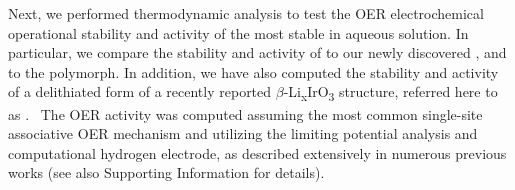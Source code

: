 %



%
%
Next, we performed  thermodynamic analysis to test the OER electrochemical operational stability and activity of the most stable \IrOx in aqueous solution.
%
In particular, we compare the stability and activity of \rIrOtwo to our newly discovered \aIrOthree, and to the \rIrOthree polymorph.
%
In addition, we have also computed the stability and activity of a delithiated form of a recently reported $\beta$-Li\textsubscript{x}IrO\textsubscript{3} structure, referred here to as \bIrOthree.~\cite{Pearce2017,Pearce2019}
%
The OER activity was computed assuming the most common single-site associative OER mechanism and utilizing the limiting potential analysis and computational hydrogen electrode, as described extensively in numerous previous works\cite{Man2011,Rossmeisl2007,Kitchin2004, Bajdich2013} (see also Supporting Information for details).


